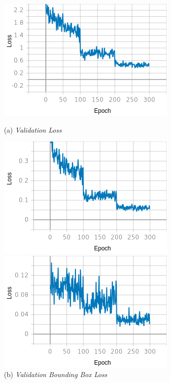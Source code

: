 \begin{figure}[H]
	\centering
	\begin{minipage}{0.45\textwidth}
		\includegraphics[width=\textwidth]{gambar/training_resnet50/tugas-akhir-Page-13.png}
		\caption*{(a) \textit{Validation Loss}}
	\end{minipage}
	\hfill
	\begin{minipage}{0.45\textwidth}
		\includegraphics[width=\textwidth]{gambar/training_resnet50/tugas-akhir-Page-13 (1).png}
		\caption*{(b) \textit{Validation Bounding Box Loss}}
	\end{minipage}
	\vfill
	\begin{minipage}{0.45\textwidth}
		\includegraphics[width=\textwidth]{gambar/training_resnet50/tugas-akhir-Page-13 (2).png}

\end{minipage}
\end{figure}
